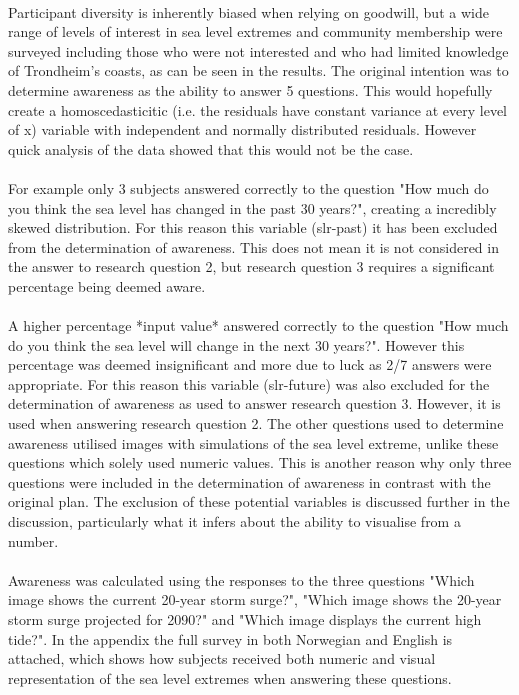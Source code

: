 \paragraph{}
  Participant diversity is inherently biased when relying on goodwill, but a wide range of levels of interest in sea level extremes and community membership were surveyed including those who were not interested and who had limited knowledge of Trondheim’s coasts, as can be seen in the results. The original intention was to determine awareness as the ability to answer 5 questions. This would hopefully create a homoscedasticitic (i.e. the residuals have constant variance at every level of x) variable with independent and normally distributed residuals. However quick analysis of the data showed that this would not be the case.
\paragraph{}
  For example only 3 subjects answered correctly to the question "How much do you think the sea level has changed in the past 30 years?", creating a incredibly skewed distribution. For this reason this variable (slr-past) it has been excluded from the determination of awareness. This does not mean it is not considered in the answer to research question 2, but research question 3 requires a significant percentage being deemed aware. 
\paragraph{}
  A higher percentage *input value* answered correctly to the question "How much do you think the sea level will change in the next 30 years?". However this percentage was deemed insignificant and more due to luck as 2/7 answers were appropriate. For this reason this variable (slr-future) was also excluded for the determination of awareness as used to answer research question 3. However, it is used when answering research question 2. The other questions used to determine awareness utilised images with simulations of the sea level extreme, unlike these questions which solely used numeric values. This is another reason why only three questions were included in the determination of awareness in contrast with the original plan. The exclusion of these potential variables is discussed further in the discussion, particularly what it infers about the ability to visualise from a number. 
\paragraph{}
Awareness was calculated using the responses to the three questions "Which image shows the current 20-year storm surge?", "Which image shows the 20-year storm surge projected for 2090?" and "Which image displays the current high tide?". In the appendix the full survey in both Norwegian and English is attached, which shows how subjects received both numeric and visual representation of the sea level extremes when answering these questions. 



